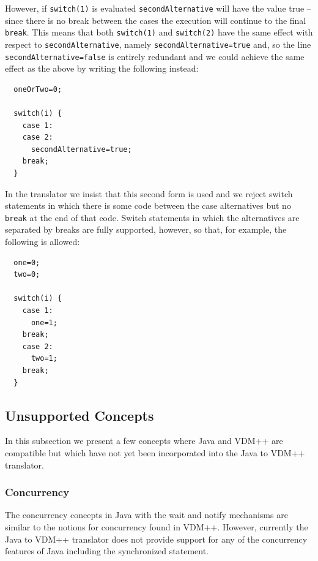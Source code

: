\documentclass[\pformat,12pt]{article}
\begin{document}
However, if \texttt{switch(1)} is evaluated \texttt{secondAlternative} will have
the value true -- since
there is no break between the cases the execution will continue to the
final \texttt{break}. This means that both \texttt{switch(1)} and \texttt{switch(2)}
have the same effect with respect to \texttt{secondAlternative}, namely
\texttt{secondAlternative=true} and, so the line
\texttt{secondAlternative=false} is entirely redundant and
we could achieve the same effect
as the above by writing the following instead:

\begin{small}
\begin{verbatim}
  oneOrTwo=0;

  switch(i) {
    case 1:
    case 2:
      secondAlternative=true;
    break;
  }
\end{verbatim}
\end{small}

In the translator we insist that this second form is used and we
reject switch statements in which there is some code between the case
alternatives but no \texttt{break} at the end of that code. Switch
statements in which the alternatives are separated by breaks are fully
supported, however, so that, for example, the following is allowed:

\begin{small}
\begin{verbatim}
  one=0;
  two=0;

  switch(i) {
    case 1:
      one=1;
    break;
    case 2:
      two=1;
    break;
  }
\end{verbatim}
\end{small}


\subsection{Unsupported Concepts}

In this subsection we present a few concepts where Java and VDM++ are
compatible but which have not yet been incorporated into the Java to
VDM++ translator. 

\subsubsection{Concurrency}

The concurrency concepts in Java with the wait and notify mechanisms
are similar to the notions for concurrency found in VDM++. However,
currently the Java to VDM++ translator does not provide support
for any of the concurrency features of Java including the
synchronized statement.
\end{document}
